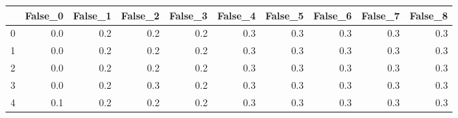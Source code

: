 \begin{tabular}{lrrrrrrrrr}
\toprule
{} &  False\_0 &  False\_1 &  False\_2 &  False\_3 &  False\_4 &  False\_5 &  False\_6 &  False\_7 &  False\_8 \\ \hline
\midrule
0 &      0.0 &      0.2 &      0.2 &      0.2 &      0.3 &      0.3 &      0.3 &      0.3 &      0.3 \\ \hline
1 &      0.0 &      0.2 &      0.2 &      0.2 &      0.3 &      0.3 &      0.3 &      0.3 &      0.3 \\ \hline
2 &      0.0 &      0.2 &      0.2 &      0.2 &      0.3 &      0.3 &      0.3 &      0.3 &      0.3 \\ \hline
3 &      0.0 &      0.2 &      0.3 &      0.2 &      0.3 &      0.3 &      0.3 &      0.3 &      0.3 \\ \hline
4 &      0.1 &      0.2 &      0.2 &      0.2 &      0.3 &      0.3 &      0.3 &      0.3 &      0.3 \\ \hline
\bottomrule
\end{tabular}
